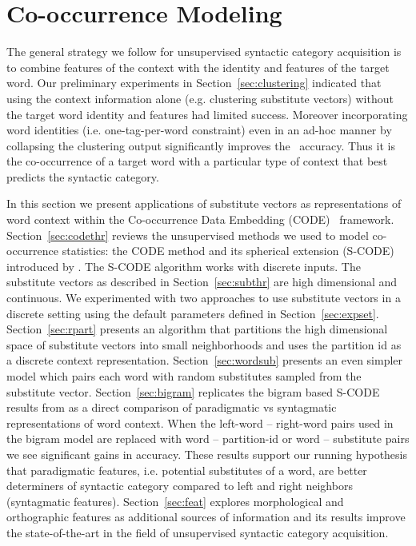 \section{Co-occurrence Modeling}
\label{sec:code}

The general strategy we follow for unsupervised syntactic category
acquisition is to combine features of the context with the identity
and features of the target word.  Our preliminary experiments in
Section~\ref{sec:clustering} indicated that using the context
information alone (e.g. clustering substitute vectors) without the
target word identity and features had limited success.  Moreover
incorporating word identities (i.e. one-tag-per-word constraint) even
in an ad-hoc manner by collapsing the clustering output significantly
improves the \mto\ accuracy.  Thus it is the co-occurrence of a target
word with a particular type of context that best predicts the
syntactic category.  

In this section we present applications of substitute vectors as
representations of word context within the Co-occurrence Data
Embedding (CODE)\ \cite{globerson2007euclidean} framework.
Section~\ref{sec:codethr} reviews the unsupervised methods we used to
model co-occurrence statistics: the CODE method and its spherical
extension (S-CODE) introduced by \cite{maron2010sphere}.  The S-CODE
algorithm works with discrete inputs.  The substitute vectors as
described in Section~\ref{sec:subthr} are high dimensional and
continuous.  We experimented with two approaches to use substitute
vectors in a discrete setting using the default parameters defined in
Section~\ref{sec:expset}.  Section~\ref{sec:rpart} presents an
algorithm that partitions the high dimensional space of substitute
vectors into small neighborhoods and uses the partition id as a
discrete context representation.  Section~\ref{sec:wordsub} presents
an even simpler model which pairs each word with random substitutes
sampled from the substitute vector.  Section~\ref{sec:bigram}
replicates the bigram based S-CODE results from \cite{maron2010sphere}
as a direct comparison of paradigmatic vs syntagmatic representations
of word context.  When the left-word -- right-word pairs used in the
bigram model are replaced with word -- partition-id or word --
substitute pairs we see significant gains in accuracy.  These results
support our running hypothesis that paradigmatic features,
i.e. potential substitutes of a word, are better determiners of
syntactic category compared to left and right neighbors (syntagmatic
features).  Section~\ref{sec:feat} explores morphological and
orthographic features as additional sources of information and its
results improve the state-of-the-art in the field of unsupervised
syntactic category acquisition.

